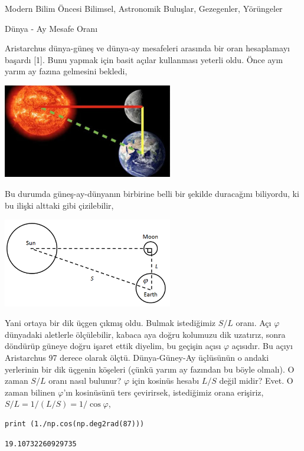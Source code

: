 \documentclass[12pt,fleqn]{article}\usepackage{../../common}
\begin{document}
Modern Bilim Öncesi Bilimsel, Astronomik Buluşlar, Gezegenler, Yörüngeler

Dünya - Ay Mesafe Oranı

Aristarchus dünya-güneş ve dünya-ay mesafeleri arasında bir oran hesaplamayı
başardı [1]. Bunu yapmak için basit açılar kullanması yeterli oldu. Önce ayın
yarım ay fazına gelmesini bekledi,

\includegraphics[width=20em]{moonshad.jpg}

Bu durumda güneş-ay-dünyanın birbirine belli bir şekilde duracağını biliyordu, ki
bu ilişki alttaki gibi çizilebilir,

\includegraphics[width=20em]{sunmoon.png}

Yani ortaya bir dik üçgen çıkmış oldu. Bulmak istediğimiz $S/L$ oranı. Açı
$\varphi$ dünyadaki aletlerle ölçülebilir, kabaca aya doğru kolumuzu dik
uzatırız, sonra döndürüp güneye doğru işaret ettik diyelim, bu geçişin açısı
$\varphi$ açısıdır. Bu açıyı Aristarchus 97 derece olarak ölçtü. Dünya-Güney-Ay
üçlüsünün o andaki yerlerinin bir dik üçgenin köşeleri (çünkü yarım ay fazından
bu böyle olmalı). O zaman $S/L$ oranı nasıl bulunur?  $\varphi$ için kosinüs
hesabı $L/S$ değil midir?  Evet. O zaman bilinen $\varphi$'ın kosinüsünü ters
çevirirsek, istediğimiz orana erişiriz, $S/L = 1/(L/S) = 1 / \cos\varphi$,

\begin{verbatim}
print (1./np.cos(np.deg2rad(87)))
\end{verbatim}

\begin{verbatim}
19.10732260929735
\end{verbatim}
\end{document}
